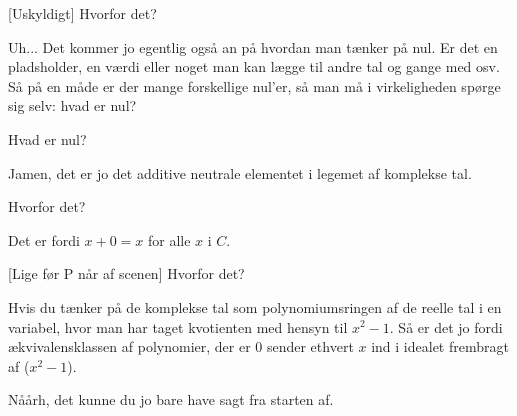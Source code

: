 \documentclass[a4paper,11pt]{article}
\begin{document}
\begin{sketch}
[Uskyldigt] Hvorfor det?

 Uh... Det kommer jo egentlig også an på hvordan man tænker på nul. Er det en pladsholder, en værdi eller noget man kan lægge til andre tal og gange med osv.  Så på en måde er der mange forskellige nul'er, så man må i virkeligheden spørge sig selv: hvad er nul?

 Hvad er nul?

 Jamen, det er jo det additive neutrale elementet i legemet af komplekse tal. 

 Hvorfor det?

 Det er fordi $x+0=x$ for alle $x$ i $C$. 

[Lige før P når af scenen] Hvorfor det?

 Hvis du tænker på de komplekse tal som polynomiumsringen af de reelle tal i en variabel, hvor man har taget kvotienten med hensyn til $x^2-1$. Så er det jo fordi ækvivalensklassen af polynomier, der er $0$ sender ethvert $x$ ind i idealet frembragt af ($x^2-1$).

 Nåårh, det kunne du jo bare have sagt fra starten af.

\end{sketch}
\end{document}
